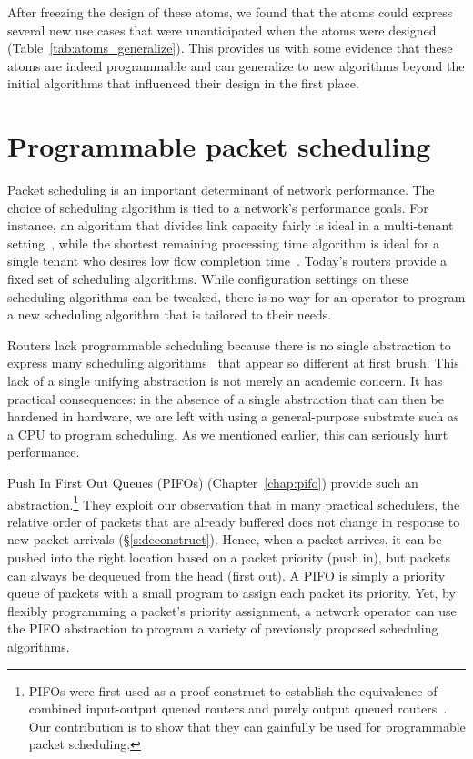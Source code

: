 After freezing the design of these atoms, we found that the atoms could express
several new use cases that were unanticipated when the atoms were designed
(Table~\ref{tab:atoms_generalize}). This provides us with some evidence that
these atoms are indeed programmable and can generalize to new algorithms beyond
the initial algorithms that influenced their design in the first place.

\section{Programmable packet scheduling}
Packet scheduling is an important determinant of network performance. The
choice of scheduling algorithm is tied to a network's performance goals. For
instance, an algorithm that divides link capacity fairly is ideal in a
multi-tenant setting~\cite{wfq}, while the shortest remaining processing time
algorithm is ideal for a single tenant who desires low flow completion
time~\cite{pFabric}. Today's routers provide a fixed set of scheduling
algorithms. While configuration settings on these scheduling algorithms can be
tweaked, there is no way for an operator to program a new scheduling algorithm
that is tailored to their needs.

Routers lack programmable scheduling because there is no single abstraction to
express many scheduling algorithms~\cite{wfq, srpt, srr, pFabric, lstf} that
appear so different at first brush. This lack of a single unifying abstraction
is not merely an academic concern. It has practical consequences: in the
absence of a single abstraction that can then be hardened in hardware, we are
left with using a general-purpose substrate such as a CPU to program
scheduling. As we mentioned earlier, this can seriously hurt performance.

 Push In First Out Queues (PIFOs) (Chapter~\ref{chap:pifo}) provide such an
abstraction.\footnote{PIFOs were first used as a proof construct to establish
the equivalence of combined input-output queued routers and purely output
queued routers~\cite{pifo}. Our contribution is to show that they can gainfully
be used for programmable packet scheduling.} They exploit our observation that
in many practical schedulers, the relative order of packets that are already
buffered does not change in response to new packet arrivals
(\S\ref{s:deconstruct}). Hence, when a packet arrives, it can be pushed into
the right location based on a packet priority (push in), but packets can always
be dequeued from the head (first out). A PIFO is simply a
priority queue of packets with a small program to assign each packet its
priority. Yet, by flexibly programming a packet's priority assignment, a
network operator can use the PIFO abstraction to program a variety of
previously proposed scheduling algorithms. 

